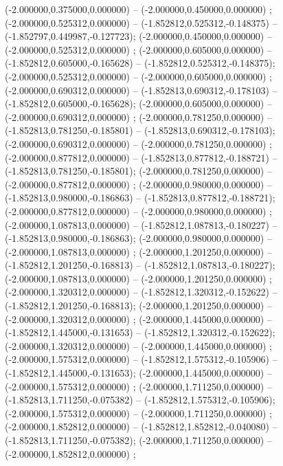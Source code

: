  (-2.000000,0.375000,0.000000) -- (-2.000000,0.450000,0.000000) ;
 (-2.000000,0.525312,0.000000) -- (-1.852812,0.525312,-0.148375) -- (-1.852797,0.449987,-0.127723);
 (-2.000000,0.450000,0.000000) -- (-2.000000,0.525312,0.000000) ;
 (-2.000000,0.605000,0.000000) -- (-1.852812,0.605000,-0.165628) -- (-1.852812,0.525312,-0.148375);
 (-2.000000,0.525312,0.000000) -- (-2.000000,0.605000,0.000000) ;
 (-2.000000,0.690312,0.000000) -- (-1.852813,0.690312,-0.178103) -- (-1.852812,0.605000,-0.165628);
 (-2.000000,0.605000,0.000000) -- (-2.000000,0.690312,0.000000) ;
 (-2.000000,0.781250,0.000000) -- (-1.852813,0.781250,-0.185801) -- (-1.852813,0.690312,-0.178103);
 (-2.000000,0.690312,0.000000) -- (-2.000000,0.781250,0.000000) ;
 (-2.000000,0.877812,0.000000) -- (-1.852813,0.877812,-0.188721) -- (-1.852813,0.781250,-0.185801);
 (-2.000000,0.781250,0.000000) -- (-2.000000,0.877812,0.000000) ;
 (-2.000000,0.980000,0.000000) -- (-1.852813,0.980000,-0.186863) -- (-1.852813,0.877812,-0.188721);
 (-2.000000,0.877812,0.000000) -- (-2.000000,0.980000,0.000000) ;
 (-2.000000,1.087813,0.000000) -- (-1.852812,1.087813,-0.180227) -- (-1.852813,0.980000,-0.186863);
 (-2.000000,0.980000,0.000000) -- (-2.000000,1.087813,0.000000) ;
 (-2.000000,1.201250,0.000000) -- (-1.852812,1.201250,-0.168813) -- (-1.852812,1.087813,-0.180227);
 (-2.000000,1.087813,0.000000) -- (-2.000000,1.201250,0.000000) ;
 (-2.000000,1.320312,0.000000) -- (-1.852812,1.320312,-0.152622) -- (-1.852812,1.201250,-0.168813);
 (-2.000000,1.201250,0.000000) -- (-2.000000,1.320312,0.000000) ;
 (-2.000000,1.445000,0.000000) -- (-1.852812,1.445000,-0.131653) -- (-1.852812,1.320312,-0.152622);
 (-2.000000,1.320312,0.000000) -- (-2.000000,1.445000,0.000000) ;
 (-2.000000,1.575312,0.000000) -- (-1.852812,1.575312,-0.105906) -- (-1.852812,1.445000,-0.131653);
 (-2.000000,1.445000,0.000000) -- (-2.000000,1.575312,0.000000) ;
 (-2.000000,1.711250,0.000000) -- (-1.852813,1.711250,-0.075382) -- (-1.852812,1.575312,-0.105906);
 (-2.000000,1.575312,0.000000) -- (-2.000000,1.711250,0.000000) ;
 (-2.000000,1.852812,0.000000) -- (-1.852812,1.852812,-0.040080) -- (-1.852813,1.711250,-0.075382);
 (-2.000000,1.711250,0.000000) -- (-2.000000,1.852812,0.000000) ;
